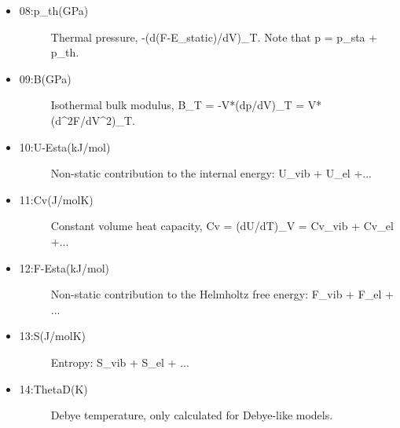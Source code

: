 \documentclass[a4paper]{article}
\begin{document}
\begin{itemize}
\begin{description}
\end{description}

\item 
\begin{description}
\item[{08:p\_th(GPa)}] \leavevmode 
Thermal pressure, -(d(F-E\_static)/dV)\_T. Note that p = p\_sta + p\_th.

\end{description}

\item 
\begin{description}
\item[{09:B(GPa)}] \leavevmode 
Isothermal bulk modulus, B\_T = -V*(dp/dV)\_T = V*(d\textasciicircum{}2F/dV\textasciicircum{}2)\_T.

\end{description}

\item 
\begin{description}
\item[{10:U-Esta(kJ/mol)}] \leavevmode 
Non-static contribution to the internal energy: U\_vib + U\_el +...

\end{description}

\item 
\begin{description}
\item[{11:Cv(J/molK)}] \leavevmode 
Constant volume heat capacity, Cv = (dU/dT)\_V = Cv\_vib + Cv\_el +...

\end{description}

\item 
\begin{description}
\item[{12:F-Esta(kJ/mol)}] \leavevmode 
Non-static contribution to the Helmholtz free energy: F\_vib +
F\_el + ...

\end{description}

\item 
\begin{description}
\item[{13:S(J/molK)}] \leavevmode 
Entropy: S\_vib + S\_el + ...

\end{description}

\item 
\begin{description}
\item[{14:ThetaD(K)}] \leavevmode 
Debye temperature, only calculated for Debye-like models.


\end{description}
\end{itemize}
\end{document}
